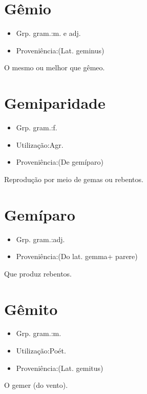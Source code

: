 \section{Gêmio}
\begin{itemize}
\item {Grp. gram.:m.  e  adj.}
\end{itemize}
\begin{itemize}
\item {Proveniência:(Lat. \textunderscore geminus\textunderscore )}
\end{itemize}
O mesmo ou melhor que \textunderscore gêmeo\textunderscore .
\section{Gemiparidade}
\begin{itemize}
\item {Grp. gram.:f.}
\end{itemize}
\begin{itemize}
\item {Utilização:Agr.}
\end{itemize}
\begin{itemize}
\item {Proveniência:(De \textunderscore gemíparo\textunderscore )}
\end{itemize}
Reprodução por meio de gemas ou rebentos.
\section{Gemíparo}
\begin{itemize}
\item {Grp. gram.:adj.}
\end{itemize}
\begin{itemize}
\item {Proveniência:(Do lat. \textunderscore gemma\textunderscore  + \textunderscore parere\textunderscore )}
\end{itemize}
Que produz rebentos.
\section{Gêmito}
\begin{itemize}
\item {Grp. gram.:m.}
\end{itemize}
\begin{itemize}
\item {Utilização:Poét.}
\end{itemize}
\begin{itemize}
\item {Proveniência:(Lat. \textunderscore gemitus\textunderscore )}
\end{itemize}
O gemer (do vento).

